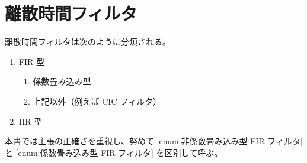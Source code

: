 \chapter{離散時間フィルタ}
    離散時間フィルタは次のように分類される。
    \begin{enumerate}
        \item FIR 型
        \begin{enumerate}
            \item 係数畳み込み型 \label{enum:係数畳み込み型 FIR フィルタ}
            \item 上記以外（例えば CIC フィルタ） \label{enum:非係数畳み込み型 FIR フィルタ}
        \end{enumerate}
        \item IIR 型
    \end{enumerate}
    本書では主張の正確さを重視し、努めて \ref{enum:非係数畳み込み型 FIR フィルタ} と \ref{enum:係数畳み込み型 FIR フィルタ} を区別して呼ぶ。
    
    
